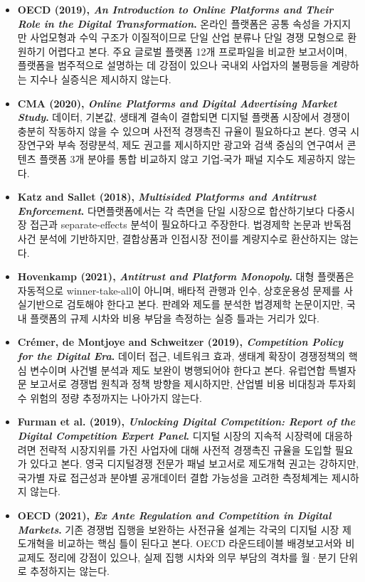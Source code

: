 \documentclass[11pt,a4paper]{report}
\begin{document}
\begin{itemize}[leftmargin=*, itemsep=0.5em]
  \item \textbf{OECD (2019), \textit{An Introduction to Online Platforms and Their Role in the Digital Transformation}.} 온라인 플랫폼은 공통 속성을 가지지만 사업모형과 수익 구조가 이질적이므로 단일 산업 분류나 단일 경쟁 모형으로 환원하기 어렵다고 본다. 주요 글로벌 플랫폼 12개 프로파일을 비교한 보고서이며, 플랫폼을 범주적으로 설명하는 데 강점이 있으나 국내외 사업자의 불평등을 계량하는 지수나 실증식은 제시하지 않는다.
  \item \textbf{CMA (2020), \textit{Online Platforms and Digital Advertising Market Study}.} 데이터, 기본값, 생태계 결속이 결합되면 디지털 플랫폼 시장에서 경쟁이 충분히 작동하지 않을 수 있으며 사전적 경쟁촉진 규율이 필요하다고 본다. 영국 시장연구와 부속 정량분석, 제도 권고를 제시하지만 광고와 검색 중심의 연구여서 콘텐츠 플랫폼 3개 분야를 통합 비교하지 않고 기업-국가 패널 지수도 제공하지 않는다.
  \item \textbf{Katz and Sallet (2018), \textit{Multisided Platforms and Antitrust Enforcement}.} 다면플랫폼에서는 각 측면을 단일 시장으로 합산하기보다 다중시장 접근과 separate-effects 분석이 필요하다고 주장한다. 법경제학 논문과 반독점 사건 분석에 기반하지만, 결합상품과 인접시장 전이를 계량지수로 환산하지는 않는다.
  \item \textbf{Hovenkamp (2021), \textit{Antitrust and Platform Monopoly}.} 대형 플랫폼은 자동적으로 winner-take-all이 아니며, 배타적 관행과 인수, 상호운용성 문제를 사실기반으로 검토해야 한다고 본다. 판례와 제도를 분석한 법경제학 논문이지만, 국내 플랫폼의 규제 시차와 비용 부담을 측정하는 실증 틀과는 거리가 있다.
  \item \textbf{Cr\'emer, de Montjoye and Schweitzer (2019), \textit{Competition Policy for the Digital Era}.} 데이터 접근, 네트워크 효과, 생태계 확장이 경쟁정책의 핵심 변수이며 사건별 분석과 제도 보완이 병행되어야 한다고 본다. 유럽연합 특별자문 보고서로 경쟁법 원칙과 정책 방향을 제시하지만, 산업별 비용 비대칭과 투자회수 위험의 정량 추정까지는 나아가지 않는다.
  \item \textbf{Furman et al. (2019), \textit{Unlocking Digital Competition: Report of the Digital Competition Expert Panel}.} 디지털 시장의 지속적 시장력에 대응하려면 전략적 시장지위를 가진 사업자에 대해 사전적 경쟁촉진 규율을 도입할 필요가 있다고 본다. 영국 디지털경쟁 전문가 패널 보고서로 제도개혁 권고는 강하지만, 국가별 자료 접근성과 분야별 공개데이터 결합 가능성을 고려한 측정체계는 제시하지 않는다.
  \item \textbf{OECD (2021), \textit{Ex Ante Regulation and Competition in Digital Markets}.} 기존 경쟁법 집행을 보완하는 사전규율 설계는 각국의 디지털 시장 제도개혁을 비교하는 핵심 틀이 된다고 본다. OECD 라운드테이블 배경보고서와 비교제도 정리에 강점이 있으나, 실제 집행 시차와 의무 부담의 격차를 월·분기 단위로 추정하지는 않는다.

\end{itemize}
\end{document}
